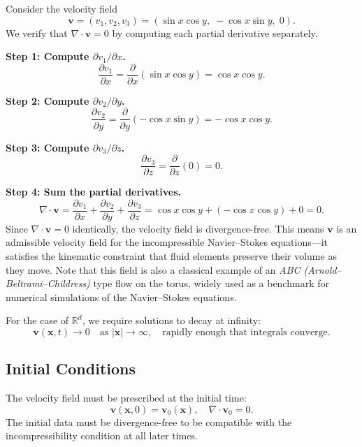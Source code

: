 \begin{example}
\label{ex:div-free-check}
Consider the velocity field
\[
\mathbf{v} = (v_1, v_2, v_3) = (\sin x \cos y, \; -\cos x \sin y, \; 0).
\]
We verify that $\nabla \cdot \mathbf{v} = 0$ by computing each partial derivative separately.

\textbf{Step 1: Compute $\partial v_1 / \partial x$.}
\[
\frac{\partial v_1}{\partial x} = \frac{\partial}{\partial x}(\sin x \cos y) = \cos x \cos y.
\]

\textbf{Step 2: Compute $\partial v_2 / \partial y$.}
\[
\frac{\partial v_2}{\partial y} = \frac{\partial}{\partial y}(-\cos x \sin y) = -\cos x \cos y.
\]

\textbf{Step 3: Compute $\partial v_3 / \partial z$.}
\[
\frac{\partial v_3}{\partial z} = \frac{\partial}{\partial z}(0) = 0.
\]

\textbf{Step 4: Sum the partial derivatives.}
\[
\nabla \cdot \mathbf{v} = \frac{\partial v_1}{\partial x} + \frac{\partial v_2}{\partial y} + \frac{\partial v_3}{\partial z} = \cos x \cos y + (-\cos x \cos y) + 0 = 0.
\]
Since $\nabla \cdot \mathbf{v} = 0$ identically, the velocity field is divergence-free. This means $\mathbf{v}$ is an admissible velocity field for the incompressible Navier--Stokes equations---it satisfies the kinematic constraint that fluid elements preserve their volume as they move. Note that this field is also a classical example of an \emph{ABC (Arnold--Beltrami--Childress)} type flow on the torus, widely used as a benchmark for numerical simulations of the Navier--Stokes equations.
\end{example}

For the case of $\mathbb{R}^d$, we require solutions to decay at infinity:
\[
\mathbf{v}(\mathbf{x}, t) \to 0 \quad \text{as } |\mathbf{x}| \to \infty, \quad \text{rapidly enough that integrals converge.}
\]

\subsection{Initial Conditions}

The velocity field must be prescribed at the initial time:
\begin{equation}
\label{eq:NS-IC}
\mathbf{v}(\mathbf{x}, 0) = \mathbf{v}_0(\mathbf{x}), \quad \nabla \cdot \mathbf{v}_0 = 0.
\end{equation}
The initial data must be divergence-free to be compatible with the incompressibility condition at all later times.

